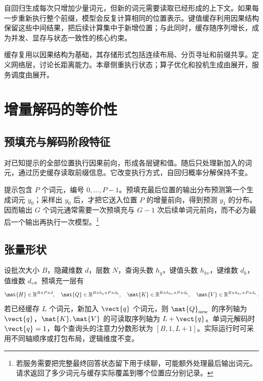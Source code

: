 \documentclass[../textbook.tex]{subfiles}
\begin{document}
\fi
{}

自回归生成每次只增加少量词元，但新的词元需要读取已经形成的上下文。如果每一步重新执行整个前缀，模型会反复计算相同的位置表示。键值缓存利用因果结构保留这些中间结果，把后续计算集中于新增位置；与此同时，缓存随序列增长，成为并发、显存与状态一致性的核心约束。

缓存复用以因果结构为基础，其存储形式包括连续布局、分页寻址和前缀共享。定义网络层，讨论长距离能力。本章侧重执行状态；算子优化和投机生成由展开，服务调度由展开。

\section{增量解码的等价性}

\subsection{预填充与解码阶段特征}
对已知提示的全部位置执行因果前向，形成各层键和值。随后只处理新加入的词元，通过历史缓存读取前缀信息。它改变执行方式，自回归概率分解保持不变。

提示包含 $P$ 个词元，编号 $0,\ldots,P-1$。预填充最后位置的输出分布预测第一个生成词元 $y_0$；采样出 $y_0$ 后，才把它送入位置 $P$ 的增量前向，得到预测 $y_1$ 的分布。因而输出 $G$ 个词元通常需要一次预填充与 $G-1$ 次后续单词元前向，而不必为最后一个输出再执行一次模型。\footnote{若服务需要把完整最终回答状态留下用于续聊，可能额外处理最后输出词元。请求返回了多少词元与缓存实际覆盖到哪个位置应分别记录。}

\subsection{张量形状}
设批次大小 $B$，隐藏维数 $d$，层数 $N$，查询头数 $h_q$，键值头数 $h_{kv}$，键维数 $d_k$，值维数 $d_v$。预填充一层有
\begin{equation}
 \mat{H}\in\mathbb R^{B\times P\times d},\quad
 \mat{Q}\in\mathbb R^{B\times h_q\times P\times d_k},\quad
 \mat{K}\in\mathbb R^{B\times h_{kv}\times P\times d_k},\quad
 \mat{V}\in\mathbb R^{B\times h_{kv}\times P\times d_v}.
\end{equation}
若已经缓存 $L$ 个词元，新加入 $\vect{q}$ 个词元，则 $\mat{Q}_{\mathrm{new}}$ 的序列轴为 $\vect{q}$，$\mat{K},\mat{V}$ 的可读取序列轴为 $L+\vect{q}$。单词元解码时 $\vect{q}=1$，每个查询头的注意力分数形状为 $[B,1,L+1]$。实际运行时可采用不同轴顺序或打包布局，逻辑维度不变。
\end{document}
